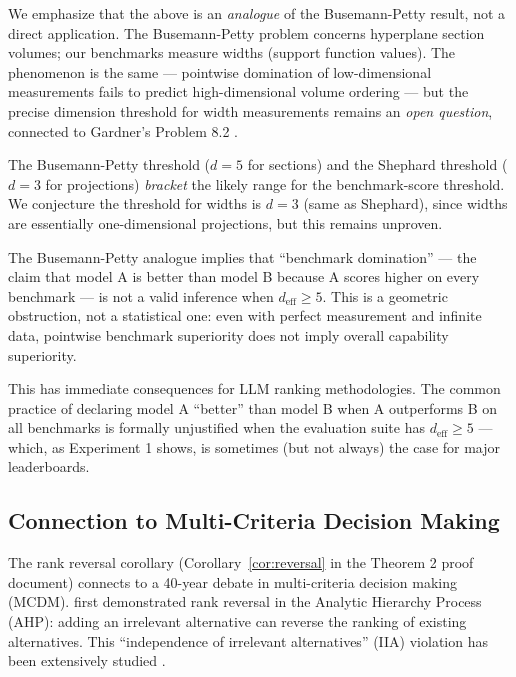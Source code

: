 \begin{remark}
We emphasize that the above is an \emph{analogue} of the Busemann-Petty result, not a direct application. The Busemann-Petty problem concerns hyperplane section volumes; our benchmarks measure widths (support function values). The phenomenon is the same --- pointwise domination of low-dimensional measurements fails to predict high-dimensional volume ordering --- but the precise dimension threshold for width measurements remains an \emph{open question}, connected to Gardner's Problem 8.2 \cite{gardner2006geometric}.

The Busemann-Petty threshold ($d = 5$ for sections) and the Shephard threshold ($d = 3$ for projections) \emph{bracket} the likely range for the benchmark-score threshold. We conjecture the threshold for widths is $d = 3$ (same as Shephard), since widths are essentially one-dimensional projections, but this remains unproven.
\end{remark}

\begin{remark}
The Busemann-Petty analogue implies that ``benchmark domination'' --- the claim that model A is better than model B because A scores higher on every benchmark --- is not a valid inference when $d_{\mathrm{eff}} \geq 5$. This is a geometric obstruction, not a statistical one: even with perfect measurement and infinite data, pointwise benchmark superiority does not imply overall capability superiority.

This has immediate consequences for LLM ranking methodologies. The common practice of declaring model A ``better'' than model B when A outperforms B on all benchmarks is formally unjustified when the evaluation suite has $d_{\mathrm{eff}} \geq 5$ --- which, as Experiment 1 shows, is sometimes (but not always) the case for major leaderboards.
\end{remark}

\subsection{Connection to Multi-Criteria Decision Making}

The rank reversal corollary (Corollary~\ref{cor:reversal} in the Theorem 2 proof document) connects to a 40-year debate in multi-criteria decision making (MCDM). \citet{belton1983short} first demonstrated rank reversal in the Analytic Hierarchy Process (AHP): adding an irrelevant alternative can reverse the ranking of existing alternatives. This ``independence of irrelevant alternatives'' (IIA) violation has been extensively studied \cite{saaty1984inconsistency, dyer1990remarks, harker1987alternative}.


